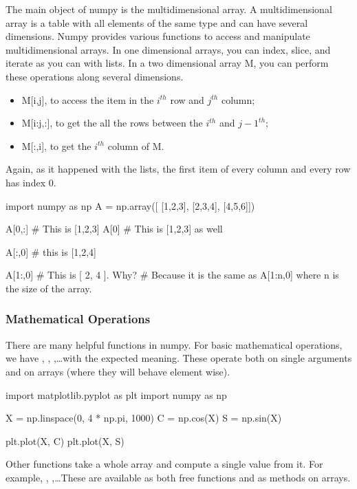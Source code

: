 The main object of numpy is the multidimensional array. A multidimensional array is a table with all elements of the same type and can have several dimensions. Numpy provides various functions to access and manipulate multidimensional arrays. In one dimensional arrays, you can index, slice, and iterate as you can with lists. In a two dimensional array M, you can perform these operations along several dimensions.

\begin{itemize}
 \item M[i,j], to access the item in the $i^{th}$ row and $j^{th}$ column; 
 \item M[i:j,:], to get the all the rows between the $i^{th}$ and $j-1^{th}$;
 \item M[:,i], to get the $i^{th}$ column of M.
\end{itemize}

\noindent Again, as it happened with the lists, the first item of every column and every row has index 0.

\begin{python}
import numpy as np
A = np.array([
    [1,2,3],
    [2,3,4],
    [4,5,6]])

A[0,:] # This is [1,2,3]
A[0] # This is [1,2,3] as well

A[:,0] # this is [1,2,4]

A[1:,0] # This is [ 2, 4 ]. Why?
        # Because it is the same as A[1:n,0] where n is the size of the array.
\end{python}

\subsubsection{Mathematical Operations}

There are many helpful functions in numpy. For basic mathematical operations, we have , , ,\ldots with the expected meaning. These operate both on single arguments and on arrays (where they will behave element wise).

\begin{python}
import matplotlib.pyplot as plt
import numpy as np

X = np.linspace(0, 4 * np.pi, 1000)
C = np.cos(X)
S = np.sin(X)

plt.plot(X, C)
plt.plot(X, S)
\end{python}

Other functions take a whole array and compute a single value from it. For example, , ,\ldots These are available as both free functions and as methods on arrays.

